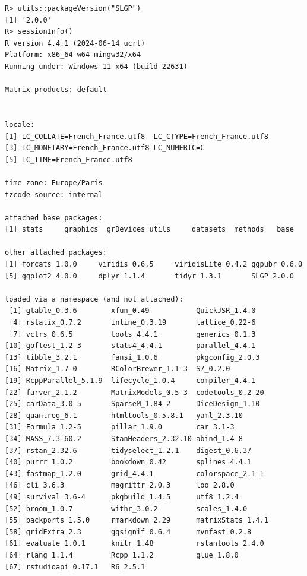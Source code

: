 \documentclass[
]{article}
\begin{document}
\begin{verbatim}
R> utils::packageVersion("SLGP")
[1] '2.0.0'
R> sessionInfo()
R version 4.4.1 (2024-06-14 ucrt)
Platform: x86_64-w64-mingw32/x64
Running under: Windows 11 x64 (build 22631)

Matrix products: default


locale:
[1] LC_COLLATE=French_France.utf8  LC_CTYPE=French_France.utf8   
[3] LC_MONETARY=French_France.utf8 LC_NUMERIC=C                  
[5] LC_TIME=French_France.utf8    

time zone: Europe/Paris
tzcode source: internal

attached base packages:
[1] stats     graphics  grDevices utils     datasets  methods   base     

other attached packages:
[1] forcats_1.0.0     viridis_0.6.5     viridisLite_0.4.2 ggpubr_0.6.0     
[5] ggplot2_4.0.0     dplyr_1.1.4       tidyr_1.3.1       SLGP_2.0.0       

loaded via a namespace (and not attached):
 [1] gtable_0.3.6        xfun_0.49           QuickJSR_1.4.0     
 [4] rstatix_0.7.2       inline_0.3.19       lattice_0.22-6     
 [7] vctrs_0.6.5         tools_4.4.1         generics_0.1.3     
[10] goftest_1.2-3       stats4_4.4.1        parallel_4.4.1     
[13] tibble_3.2.1        fansi_1.0.6         pkgconfig_2.0.3    
[16] Matrix_1.7-0        RColorBrewer_1.1-3  S7_0.2.0           
[19] RcppParallel_5.1.9  lifecycle_1.0.4     compiler_4.4.1     
[22] farver_2.1.2        MatrixModels_0.5-3  codetools_0.2-20   
[25] carData_3.0-5       SparseM_1.84-2      DiceDesign_1.10    
[28] quantreg_6.1        htmltools_0.5.8.1   yaml_2.3.10        
[31] Formula_1.2-5       pillar_1.9.0        car_3.1-3          
[34] MASS_7.3-60.2       StanHeaders_2.32.10 abind_1.4-8        
[37] rstan_2.32.6        tidyselect_1.2.1    digest_0.6.37      
[40] purrr_1.0.2         bookdown_0.42       splines_4.4.1      
[43] fastmap_1.2.0       grid_4.4.1          colorspace_2.1-1   
[46] cli_3.6.3           magrittr_2.0.3      loo_2.8.0          
[49] survival_3.6-4      pkgbuild_1.4.5      utf8_1.2.4         
[52] broom_1.0.7         withr_3.0.2         scales_1.4.0       
[55] backports_1.5.0     rmarkdown_2.29      matrixStats_1.4.1  
[58] gridExtra_2.3       ggsignif_0.6.4      mvnfast_0.2.8      
[61] evaluate_1.0.1      knitr_1.48          rstantools_2.4.0   
[64] rlang_1.1.4         Rcpp_1.1.2          glue_1.8.0         
[67] rstudioapi_0.17.1   R6_2.5.1           
\end{verbatim}
\end{document}
